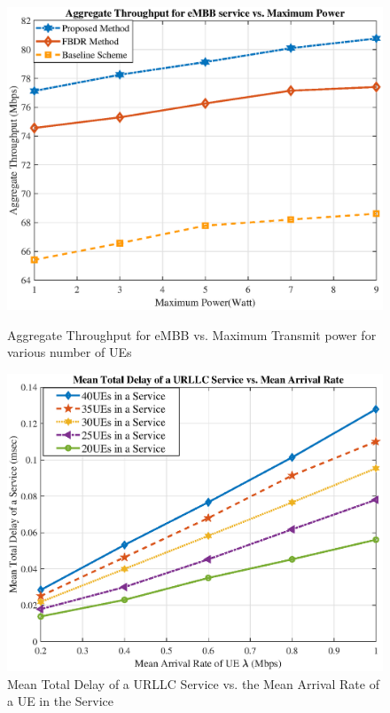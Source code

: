 \documentclass[lettersize,journal]{IEEEtran}
\begin{document}
\begin{figure}%
  \centering
  \captionsetup{justification=centering}
  \begin{minipage}[b]{0.4\textwidth}
    \includegraphics[scale = 0.3]{RatePower1.eps}
    \caption{Aggregate Throughput for eMBB vs. Maximum Transmit power for various number of UEs }
  \label{fig:5}
  \end{minipage}
  \qquad
  \begin{minipage}[b]{0.4\textwidth}
      \includegraphics[scale = 0.3]{delay_new.eps}
  \caption{Mean Total Delay of a URLLC Service vs. the Mean Arrival Rate of a UE in the Service}%
  \label{fig:6}
  \end{minipage}
\end{figure}
\end{document}
